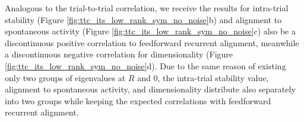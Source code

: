 \documentclass[11pt]{article}
\begin{document}
	Analogous to the trial-to-trial correlation, we receive the results for intra-trial stability (Figure \ref{fig:ttc_its_low_rank_sym_no_noise}b) and alignment to spontaneous activity (Figure \ref{fig:ttc_its_low_rank_sym_no_noise}c) also be a discontinuous positive correlation to feedforward recurrent alignment, meanwhile a discontinuous negative correlation for dimensionality (Figure \ref{fig:ttc_its_low_rank_sym_no_noise}d). Due to the same reason of existing only two groups of eigenvalues at $R$ and $0$, the intra-trial stability value, alignment to spontaneous activity, and dimensionality distribute also separately into two groups while keeping the expected correlations with feedforward recurrent alignment.
	
	
\end{document}
